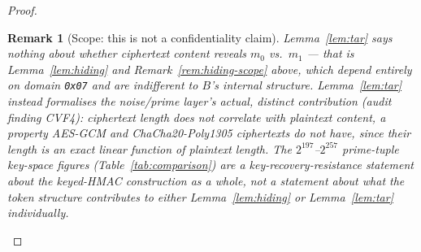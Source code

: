 \documentclass[11pt,a4paper]{article}
\newtheorem{remark}[theorem]{Remark}
\begin{document}
\begin{proof}
\begin{remark}[Scope: this is not a confidentiality claim]
Lemma~\ref{lem:tar} says nothing about whether ciphertext \emph{content}
reveals $m_0$ vs.\ $m_1$ --- that is Lemma~\ref{lem:hiding} and Remark~\ref{rem:hiding-scope}
above, which depend entirely on domain \texttt{0x07} and are indifferent to
$B$'s internal structure. Lemma~\ref{lem:tar} instead formalises the
noise/prime layer's actual, distinct contribution (audit finding CVF4):
ciphertext length does not correlate with plaintext content, a property
AES-GCM and ChaCha20-Poly1305 ciphertexts do not have, since their length
is an exact linear function of plaintext length. The $2^{197}$--$2^{257}$
prime-tuple key-space figures (Table~\ref{tab:comparison}) are a
key-recovery-resistance statement about the keyed-HMAC construction as a
whole, not a statement about what the token structure contributes to
either Lemma~\ref{lem:hiding} or Lemma~\ref{lem:tar} individually.
\end{remark}


\end{proof}
\end{document}
